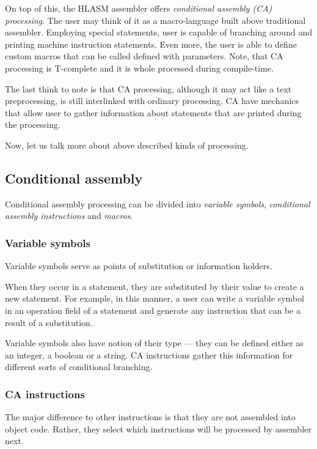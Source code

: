 On top of this, the HLASM assembler offers \emph{conditional assembly (CA) processing}. The user may think of it as a macro-language built above traditional assembler. Employing special statements, user is capable of branching around and printing machine instruction statements. Even more, the user is able to define custom macros that can be called defined with parameters. Note, that CA processing is T-complete and it is whole processed during compile-time.

The last think to note is that CA processing, although it may act like a text preprocessing, is still interlinked with ordinary processing. CA have mechanics that allow user to gather information about statements that are printed during the processing.

\vspace{5mm}

Now, let us talk more about above described kinds of processing.

\subsection{Conditional assembly}

Conditional assembly processing can be divided into \emph{variable symbols}, \emph{conditional assembly instructions} and \emph{macros}. 

\subsubsection{Variable symbols}

Variable symbols serve as points of substitution or information holders. 

When they occur in a statement, they are substituted by their value to create a new statement. For example, in this manner, a user can write a variable symbol in an operation field of a statement and generate any instruction that can be a result of a substitution.

Variable symbols also have notion of their type --- they can be defined either as an integer, a boolean or a string. CA instructions gather this information for different sorts of conditional branching.

\subsubsection{CA instructions}

The major difference to other instructions is that they are not assembled into object code. Rather, they select which instructions will be processed by assembler next.

